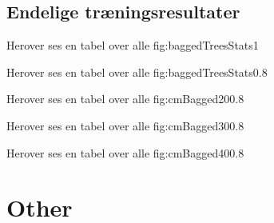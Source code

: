 \section{Endelige træningsresultater}

{Herover ses en tabel over alle }{fig:baggedTreesStats}{1}

{Herover ses en tabel over alle }{fig:baggedTreesStats}{0.8}

{Herover ses en tabel over alle }{fig:cmBagged20}{0.8}

{Herover ses en tabel over alle }{fig:cmBagged30}{0.8}

{Herover ses en tabel over alle }{fig:cmBagged40}{0.8}

\chapter{Other}
\newpage
\listoftables
\vspace{1cm}
\listoffigures